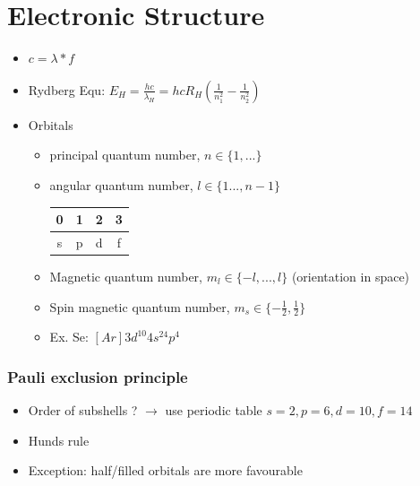 \documentclass[ wastespaceontitle, english]{cheat_sheet_template}
\begin{document}
    \section{Electronic Structure}
        \begin{itemize}
            \item $c = \lambda * f$
            
            \item Rydberg Equ: $ E_H = \frac{h c}{\lambda_H} = h c R_H (\frac{1}{n_1^2} - \frac{1}{n_2^2})$
            \item Orbitals 
            \begin{itemize}
                \item principal quantum number, $n \in \{1, ...\}$
                \item angular quantum number, $l \in \{1 ... , n-1\}$ \begin{tabular}{c|c|c|c}
                        0 & 1 & 2  & 3  \\ \hline
                         s & p & d & f
                    \end{tabular}
                \item Magnetic quantum number, $m_l \in \{ -l, ... ,l\}$ (orientation in space)
                \item Spin magnetic quantum number, $m_s \in \{-\frac{1}{2}, \frac{1}{2}\}$
                \item Ex. Se: $[Ar]3d^{10}4s^24p^4$
            \end{itemize}
        \end{itemize}
        \subsubsection{Pauli exclusion principle}
        \begin{itemize}
            \item Order of subshells ? $\to$ use periodic table $s=2, p=6, d =10, f=14$
            \item Hunds rule
            \item Exception: half/filled orbitals are more favourable
        \end{itemize}
\end{document}
